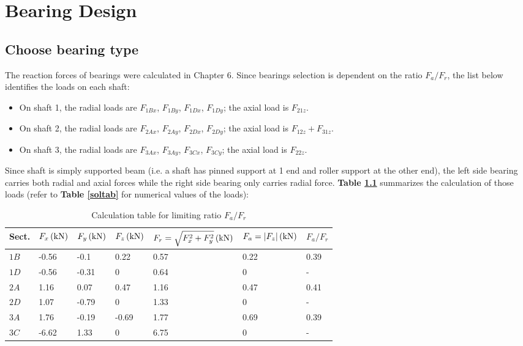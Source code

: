 \chapter{Bearing Design}

\section{Choose bearing type}
The reaction forces of bearings were calculated in Chapter 6. Since bearings selection is dependent on the ratio $ F_a/F_r $, the list below identifies the loads on each shaft:
\begin{itemize}
	\item On shaft 1, the radial loads are $ F_{1Bx} $, $ F_{1By} $, $ F_{1Dx} $, $ F_{1Dy} $; the axial load is $ F_{21z} $.
	\item On shaft 2, the radial loads are $ F_{2Ax} $, $ F_{2Ay} $, $ F_{2Dx} $, $ F_{2Dy} $; the axial load is $ F_{12z} + F_{31z} $.
	\item On shaft 3, the radial loads are $ F_{3Ax} $, $ F_{3Ay} $, $ F_{3Cx} $, $ F_{3Cy} $; the axial load is $ F_{22z} $.
\end{itemize}

Since shaft is simply supported beam (i.e. a shaft has pinned support at 1 end and roller support at the other end), the left side bearing carries both radial and axial forces while the right side bearing only carries radial force. \textbf{Table \ref{Fr/Fa}} summarizes the calculation of those loads (refer to \textbf{Table \ref{soltab}} for numerical values of the loads):

\begin{table}[ht]
	\centering
	\caption{Calculation table for limiting ratio $ F_a/F_r $}
	\begin{tabular}{lllllll}\toprule
		Sect. & $ F_x \, (\mathrm{kN}) $ & $ F_y \, (\mathrm{kN}) $ & $ F_z \, (\mathrm{kN}) $ & $ F_r = \sqrt{F_x^2+F_y^2} \, (\mathrm{kN}) $ & $ F_a = |F_z| \, (\mathrm{kN}) $ & $ F_a/F_r $ \\ \midrule
		$ 1B $ & -0.56 & -0.1 & 0.22 & 0.57 & 0.22 & 0.39 \\
		$ 1D $ & -0.56 & -0.31 & 0 & 0.64 & 0 & - \\
		$ 2A $ & 1.16 & 0.07 & 0.47 & 1.16 & 0.47 & 0.41 \\
		$ 2D $ & 1.07 & -0.79 & 0 & 1.33 & 0 & - \\
		$ 3A $ & 1.76 & -0.19 & -0.69 & 1.77 & 0.69 & 0.39 \\
		$ 3C $ & -6.62 & 1.33 & 0 & 6.75 & 0 & -\\
		\bottomrule
	\end{tabular}
	\label{Fr/Fa}
\end{table}

